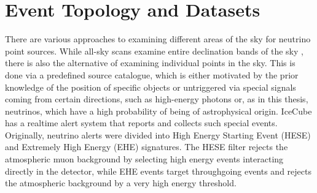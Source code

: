 \chapter{Event Topology and Datasets} \label{sec:events_data}

%

There are various approaches to examining different areas of the sky for neutrino point sources.
While all-sky scans examine entire declination bands of the sky \cite{all_sky_paper}, there is also the alternative of examining individual points in the sky.
This is done via a predefined source catalogue, which is either motivated by the prior knowledge of the position of specific objects or untriggered via special signals coming from certain directions, such as high-energy photons or, as in this thesis, neutrinos, which have a high probability of being of astrophysical origin.
IceCube has a realtime alert system that reports and collects such special events.
Originally, neutrino alerts were divided into High Energy Starting Event (HESE) and Extremely High Energy (EHE) signatures.
The HESE filter rejects the atmospheric muon background by selecting high energy events interacting directly in the detector, while EHE events target throughgoing events and rejects the atmospheric background by a very high energy threshold.

